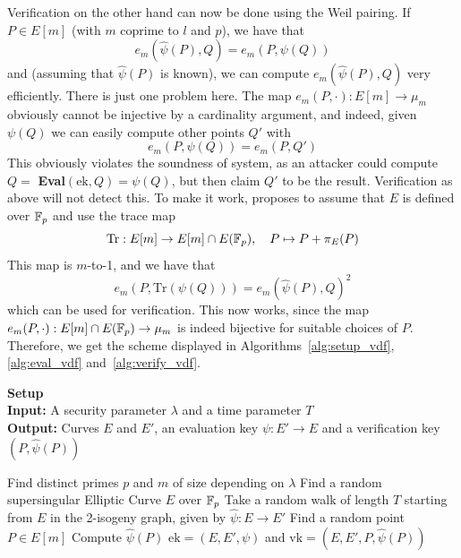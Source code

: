 Verification on the other hand can now be done using the Weil pairing.
If $P \in E[m]$ (with $m$ coprime to $l$ and $p$), we have that
\begin{equation*}
    e_m(\hat{\psi}(P), Q) = e_m(P, \psi(Q))
\end{equation*}
and (assuming that $\hat{\psi}(P)$ is known), we can compute $e_m(\hat{\psi}(P), Q)$ very efficiently.
There is just one problem here.
The map $e_m(P, \cdot): E[m] \to \mu_m$ obviously cannot be injective by a cardinality argument, and indeed, given $\psi(Q)$ we can easily compute other points $Q'$ with
\begin{equation*}
    e_m(P, \psi(Q)) = e_m(P, Q')
\end{equation*}
This obviously violates the soundness of system, as an attacker could compute $Q = $ \textbf{Eval}$(\mathrm{ek}, Q) = \psi(Q)$, but then claim $Q'$ to be the result.
Verification as above will not detect this.
To make it work, \cite{verifiable_delay_function} proposes to assume that $E$ is defined over $\mathbb{F}_p$ and use the trace map
\begin{equation*}
    \mathrm{Tr}: E[m] \to E[m] \cap E(\mathbb{F}_p), \quad P \mapsto P + \pi_E(P)
\end{equation*}
This map is $m$-to-1, and we have that
\begin{equation*}
    e_m(P, \mathrm{Tr}(\psi(Q))) = e_m(\hat{\psi}(P), Q)^2
\end{equation*}
which can be used for verification.
This now works, since the map $e_m(P, \cdot): E[m] \cap E(\mathbb{F}_p) \to \mu_m$ is indeed bijective for suitable choices of $P$.
Therefore, we get the scheme displayed in Algorithms~\ref{alg:setup_vdf}, \ref{alg:eval_vdf} and~\ref{alg:verify_vdf}.
\begin{algorithm}
    \caption{\label{alg:setup_vdf} \textbf{Setup}\\
    \textbf{Input:} A security parameter $\lambda$ and a time parameter $T$\\
    \textbf{Output:} Curves $E$ and $E'$, an evaluation key $\psi: E' \to E$ and a verification key $(P, \hat{\psi}(P))$}
    \begin{algorithmic}[1]
        \State Find distinct primes $p$ and $m$ of size depending on $\lambda$
        \State Find a random supersingular Elliptic Curve $E$ over $\mathbb{F}_p$
        \State Take a random walk of length $T$ starting from $E$ in the 2-isogeny graph, given by $\hat{\psi}: E \to E'$
        \State Find a random point $P \in E[m]$
        \State Compute $\hat{\psi}(P)$
        \State\Return $\mathrm{ek} = (E, E', \psi)$ and $\mathrm{vk} = (E, E', P, \hat{\psi}(P))$
    \end{algorithmic}
\end{algorithm}
